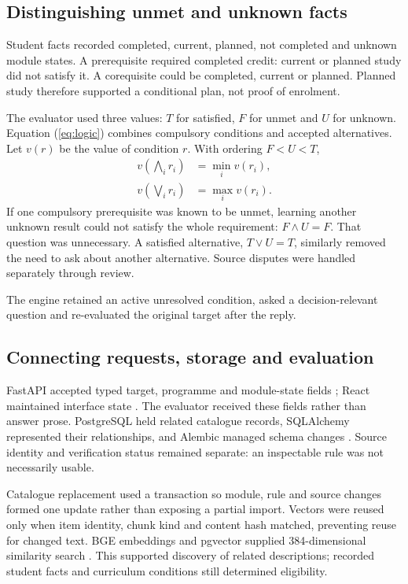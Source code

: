 \subsection{Distinguishing unmet and unknown facts}
Student facts recorded completed, current, planned, not completed and unknown module states. A prerequisite required completed credit: current or planned study did not satisfy it. A corequisite could be completed, current or planned. Planned study therefore supported a conditional plan, not proof of enrolment.

The evaluator used three values: $T$ for satisfied, $F$ for unmet and $U$ for unknown. Equation (\ref{eq:logic}) combines compulsory conditions and accepted alternatives. Let $v(r)$ be the value of condition $r$. With ordering $F<U<T$,
\begin{equation}
 \begin{aligned}
 v\!\left(\bigwedge_i r_i\right)&=\min_i v(r_i),\\
 v\!\left(\bigvee_i r_i\right)&=\max_i v(r_i).
 \end{aligned}
\label{eq:logic}
\end{equation}
If one compulsory prerequisite was known to be unmet, learning another unknown result could not satisfy the whole requirement: $F\land U=F$. That question was unnecessary. A satisfied alternative, $T\lor U=T$, similarly removed the need to ask about another alternative. Source disputes were handled separately through review.

The engine retained an active unresolved condition, asked a decision-relevant question and re-evaluated the original target after the reply.

\subsection{Connecting requests, storage and evaluation}
FastAPI accepted typed target, programme and module-state fields \cite{fastapi}; React maintained interface state \cite{react}. The evaluator received these fields rather than answer prose. PostgreSQL held related catalogue records, SQLAlchemy represented their relationships, and Alembic managed schema changes \cite{alembic}. Source identity and verification status remained separate: an inspectable rule was not necessarily usable.

Catalogue replacement used a transaction \cite{sqlalchemy} so module, rule and source changes formed one update rather than exposing a partial import. Vectors were reused only when item identity, chunk kind and content hash matched, preventing reuse for changed text. BGE embeddings and pgvector supplied 384-dimensional similarity search \cite{pgvector,bge}. This supported discovery of related descriptions; recorded student facts and curriculum conditions still determined eligibility.

